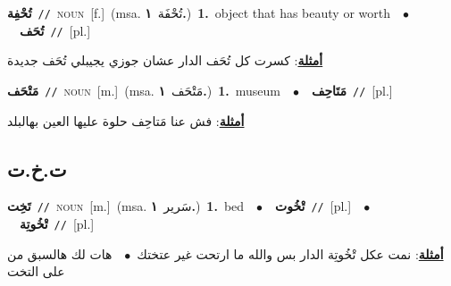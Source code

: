 \documentclass[10pt,a4paper,twoside]{article} %
\begin{document}
\begin{multicols}{2}
{\setlength\topsep{0pt}\textbf{\foreignlanguage{arabic}{تُحْفِة}}\ {\color{gray}\texttt{//}\color{black}}\ \textsc{noun}\ [f.]\ \color{gray}(msa. \foreignlanguage{arabic}{تُحْفَة}~\foreignlanguage{arabic}{\textbf{١.}})\color{black}\ \textbf{1.}~object that has beauty or worth\ \ $\bullet$\ \ \setlength\topsep{0pt}\textbf{\foreignlanguage{arabic}{تُحَف}}\ {\color{gray}\texttt{//}\color{black}}\ [pl.]\  \begin{flushright}\color{gray}\foreignlanguage{arabic}{\textbf{\underline{\foreignlanguage{arabic}{أمثلة}}}: كسرت كل تُحَف الدار عشان جوزي يجيبلي تُحَف جديدة}\end{flushright}\color{black}} \vspace{2mm}

{\setlength\topsep{0pt}\textbf{\foreignlanguage{arabic}{مَتْحَف}}\ {\color{gray}\texttt{//}\color{black}}\ \textsc{noun}\ [m.]\ \color{gray}(msa. \foreignlanguage{arabic}{مَتْحَف}~\foreignlanguage{arabic}{\textbf{١.}})\color{black}\ \textbf{1.}~museum\ \ $\bullet$\ \ \setlength\topsep{0pt}\textbf{\foreignlanguage{arabic}{مَتَاحِف}}\ {\color{gray}\texttt{//}\color{black}}\ [pl.]\  \begin{flushright}\color{gray}\foreignlanguage{arabic}{\textbf{\underline{\foreignlanguage{arabic}{أمثلة}}}: فش عنا مَتاحِف حلوة عليها العين بهالبلد}\end{flushright}\color{black}} \vspace{2mm}

\vspace{-3mm}
\subsection*{\color{blue}\foreignlanguage{arabic}{ت.خ.ت}\color{blue}{}} 

{\setlength\topsep{0pt}\textbf{\foreignlanguage{arabic}{تَخِت}}\ {\color{gray}\texttt{//}\color{black}}\ \textsc{noun}\ [m.]\ \color{gray}(msa. \foreignlanguage{arabic}{سَرير}~\foreignlanguage{arabic}{\textbf{١.}})\color{black}\ \textbf{1.}~bed\ \ $\bullet$\ \ \setlength\topsep{0pt}\textbf{\foreignlanguage{arabic}{تْخُوت}}\ {\color{gray}\texttt{//}\color{black}}\ [pl.]\ \ $\bullet$\ \ \setlength\topsep{0pt}\textbf{\foreignlanguage{arabic}{تْخُوتِة}}\ {\color{gray}\texttt{//}\color{black}}\ [pl.]\  \begin{flushright}\color{gray}\foreignlanguage{arabic}{\textbf{\underline{\foreignlanguage{arabic}{أمثلة}}}: نمت عكل تْخُوتِة الدار بس والله ما ارتحت غير عتختك\ $\bullet$\ \  هات لك هالسبق من على التخت}\end{flushright}\color{black}} \vspace{2mm}


\end{multicols}
\end{document}
